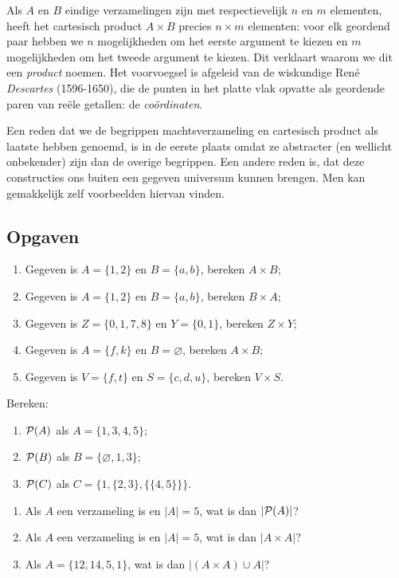 Als $A$ en $B$ eindige verzamelingen zijn met respectievelijk $n$ en $m$ elementen, heeft het cartesisch product $A\times B$ precies $n\times m$ elementen: voor elk geordend paar hebben we $n$ mogelijkheden om het eerste argument te kiezen en $m$ mogelijkheden om het tweede argument te kiezen. Dit verklaart waarom we dit een \textit{product} noemen. Het voorvoegsel is afgeleid van de wiskundige Ren\'e \textit{Descartes} (1596-1650), die de punten in het platte vlak opvatte als geordende paren van re\"ele getallen: de \textit{co\"ordinaten}.

Een reden dat we de begrippen machtsverzameling en cartesisch product als laatste hebben genoemd, is in de eerste plaats omdat ze abstracter (en wellicht onbekender) zijn dan de overige begrippen. Een andere reden is, dat deze constructies ons buiten een gegeven universum kunnen brengen. Men kan gemakkelijk zelf voorbeelden hiervan vinden.

\subsection{Opgaven}
\begin{exercise}\mbox{}
\begin{enumerate}[label=\textit{\alph*.}]
\item Gegeven is $A=\{1,2\}$ en $B=\{a,b\}$, bereken $A\times B$;
\item Gegeven is $A=\{1,2\}$ en $B=\{a,b\}$, bereken $B\times A$;
\item Gegeven is $Z=\{0,1,7,8\}$ en $Y=\{0,1\}$, bereken $Z\times Y$;
\item Gegeven is $A=\{f,k\}$ en $B=\varnothing$, bereken $A\times B$;
\item Gegeven is $V=\{f,t\}$ en $S=\{c,d,u\}$, bereken $V\times S$.
\end{enumerate}
\end{exercise}

\begin{exercise} Bereken:
\begin{enumerate}[label=\textit{\alph*.}]
\item $\mathcal{P}(A)$ als $A = \{1,3,4,5\}$;
\item $\mathcal{P}(B)$ als $B=\{\varnothing, 1,3\}$;
\item $\mathcal{P}(C)$ als $C=\{1,\{2,3\},\{\{4,5\}\}\}$.
\end{enumerate}
\end{exercise}

\begin{exercise}\mbox{}
\begin{enumerate}[label=\textit{\alph*.}]
\item Als $A$ een verzameling is en $|A|=5$, wat is dan $|\mathcal{P}(A)|$?
\item Als $A$ een verzameling is en $|A|=5$, wat is dan $|A\times A|$?
\item Als $A=\{12,14,5,1\}$, wat is dan $|(A\times A)\cup A|$?
\end{enumerate}
\end{exercise}

